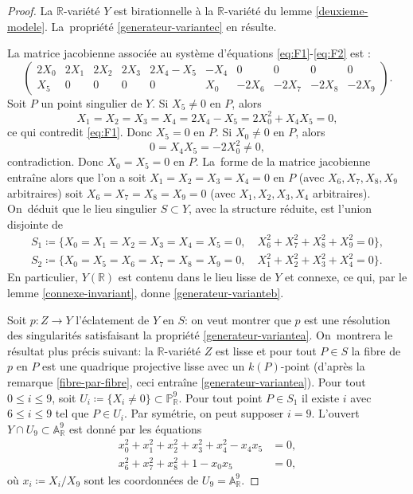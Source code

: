 \documentclass[11pt]{article}
\theoremstyle{definition}
\newcommand{\R}{\mathbb R}
\newcommand{\A}{\mathbb A}
\renewcommand{\P}{\mathbb P}
\begin{document}
\begin{proof}
La $\R$-variété $Y$ est birationnelle à la $\R$-variété du lemme \ref{deuxieme-modele}. La~propriété \eqref{generateur-variantec} en résulte.

La matrice jacobienne associée au système d'équations \eqref{eq:F1}-\eqref{eq:F2} est :
\[
 \begin{pmatrix} 2X_0 & 2X_1 & 2X_2 & 2X_3 & 2X_4-X_5 & -X_4 & 0 & 0 & 0 & 0 \\ X_5 & 0 & 0 & 0 & 0 & X_0 & -2X_6 & -2X_7 & -2X_8 & -2X_9 \end{pmatrix}. 
\]
Soit $P$ un point singulier de $Y$. Si $X_5\neq 0$ en $P$, alors
\[X_1=X_2=X_3=X_4=2X_4-X_5=2X_0^2+X_4X_5=0,\] ce qui contredit \eqref{eq:F1}. Donc $X_5=0$ en $P$. Si $X_0\neq 0$ en $P$, alors \[0=X_4X_5=-2X_0^2\neq 0,\] contradiction. Donc $X_0=X_5=0$ en $P$. La~forme de la matrice jacobienne entraîne alors que l'on a soit $X_1=X_2=X_3=X_4=0$ en $P$ (avec $X_6,X_7,X_8,X_9$ arbitraires) soit $X_6=X_7=X_8=X_9=0$ (avec $X_1,X_2,X_3,X_4$ arbitraires). On~déduit que le lieu singulier $S\subset Y$, avec la structure réduite, est l'union disjointe de
\begin{align*}
S_1\coloneqq \{ X_0=X_1=X_2=X_3=X_4=X_5=0, \quad X_6^2+X_7^2+X_8^2+X_9^2=0\},\\
S_2\coloneqq\{ X_0=X_5=X_6=X_7=X_8=X_9=0, \quad X_1^2+X_2^2+X_3^2+X_4^2=0\}.
\end{align*}
En particulier, $Y(\R)$ est contenu dans le lieu lisse de $Y$ et connexe, ce qui, par le lemme \ref{connexe-invariant}, donne \eqref{generateur-varianteb}.

Soit $p\colon Z\to Y$ l'éclatement de $Y$ en $S$: on veut montrer que $p$ est une résolution des singularités satisfaisant la propriété \eqref{generateur-variantea}. On~montrera le résultat plus précis suivant: la $\R$-variété $Z$ est lisse et pour tout $P\in S$ la fibre de $p$ en $P$ est une quadrique projective lisse avec un $k(P)$-point (d'après la remarque \ref{fibre-par-fibre}, ceci entraîne \eqref{generateur-variantea}). Pour tout $0\leq i\leq 9$, soit $U_i\coloneqq \{X_i\neq 0\}\subset \P^9_\R$. Pour tout point $P\in S_1$ il existe $i$ avec $6\leq i\leq 9$ tel que $P\in U_i$. Par symétrie, on peut supposer $i=9$. L'ouvert $Y\cap U_9\subset \A^9_\R$ est donné par les équations
\begin{align*}
x_0^2+x_1^2+x_2^2+x_3^2+x_4^2-x_4x_5 &= 0,\\
x_6^2+x_7^2+x_8^2+1-x_0x_5&= 0,
\end{align*}
où $x_i\coloneqq X_i/X_9$ sont les coordonnées de $U_9=\A^9_\R$.


\end{proof}
\end{document}
